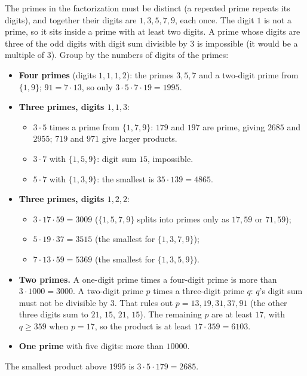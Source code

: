 The primes in the factorization must be distinct (a repeated prime repeats its digits), and together their digits are $1,3,5,7,9$, each once. The digit $1$ is not a prime, so it sits inside a prime with at least two digits. A prime whose digits are three of the odd digits with digit sum divisible by $3$ is impossible (it would be a multiple of $3$). Group by the numbers of digits of the primes:
\begin{itemize}
\item \textbf{Four primes} (digits $1,1,1,2$): the primes $3,5,7$ and a two-digit prime from $\{1,9\}$; $91=7\cdot13$, so only $3\cdot5\cdot7\cdot19=1995$.
\item \textbf{Three primes, digits $1,1,3$}:
\begin{itemize}
\item $3\cdot5$ times a prime from $\{1,7,9\}$: $179$ and $197$ are prime, giving $2685$ and $2955$; $719$ and $971$ give larger products.
\item $3\cdot7$ with $\{1,5,9\}$: digit sum $15$, impossible.
\item $5\cdot7$ with $\{1,3,9\}$: the smallest is $35\cdot139=4865$.
\end{itemize}
\item \textbf{Three primes, digits $1,2,2$}:
\begin{itemize}
\item $3\cdot17\cdot59=3009$ ($\{1,5,7,9\}$ splits into primes only as $17,59$ or $71,59$);
\item $5\cdot19\cdot37=3515$ (the smallest for $\{1,3,7,9\}$);
\item $7\cdot13\cdot59=5369$ (the smallest for $\{1,3,5,9\}$).
\end{itemize}
\item \textbf{Two primes.} A one-digit prime times a four-digit prime is more than $3\cdot1000=3000$. A two-digit prime $p$ times a three-digit prime $q$: $q$'s digit sum must not be divisible by $3$. That rules out $p=13,19,31,37,91$ (the other three digits sum to $21$, $15$, $21$, $15$). The remaining $p$ are at least $17$, with $q\ge359$ when $p=17$, so the product is at least $17\cdot359=6103$.
\item \textbf{One prime} with five digits: more than $10000$.
\end{itemize}
The smallest product above $1995$ is $3\cdot5\cdot179=\boxed{2685}$.
